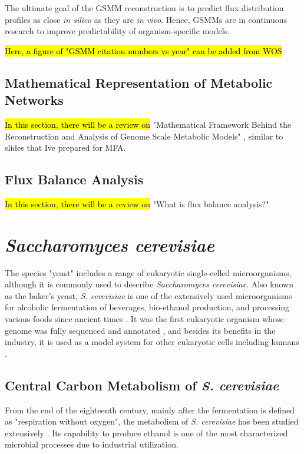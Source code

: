 The ultimate goal of the GSMM reconstruction is to predict flux distribution profiles as close \emph{in silico} as they are \emph{in vivo}. Hence, GSMMs are in continuous research to improve predictability of organism-specific models.

\hl{Here, a figure of "GSMM citation numbers vs year" can be added from WOS}

\subsection{Mathematical Representation of Metabolic Networks}
\hl{In this section, there will be a review on} "Mathematical Framework Behind the Reconstruction and Analysis of Genome Scale Metabolic Models" \cite{pinzon2018mathematical}, similar to slides that Ive prepared for MFA.

\subsection{Flux Balance Analysis}
\hl{In this section, there will be a review on} "What is flux balance analysis?" \cite{orth2010flux}

\section{\emph{Saccharomyces cerevisiae}}

The species "yeast" includes a range of eukaryotic single-celled microorganisms, although it is commonly used to describe \emph{Saccharomyces cerevisiae}. Also known as the baker's yeast, \emph{S. cerevisiae} is one of the extensively used microorganisms for alcoholic fermentation of beverages, bio-ethanol production, and processing various foods since ancient times \cite{gelinas2009inventions}. It was the first eukaryotic organism whose genome was fully sequenced and annotated \cite{goffeau1997multidrug}, and besides its benefits in the industry, it is used as a model system for other eukaryotic cells including humans \cite{dujon1996yeast, botstein1997yeast}.

\subsection{Central Carbon Metabolism of \emph{S. cerevisiae}}
From the end of the eighteenth century, mainly after the fermentation is defined as "respiration without oxygen", the metabolism of \emph{S. cerevisiae} has been studied extensively \cite{barnett1998history, barnett2000history}. Its capability to produce ethanol is one of the most characterized microbial processes due to industrial utilization.


